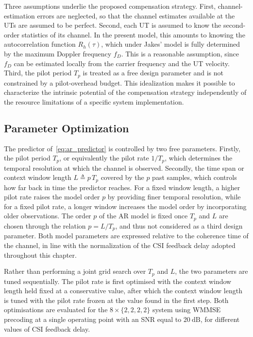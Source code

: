 Three assumptions underlie the proposed compensation strategy.
First, channel-estimation errors are neglected, so that the channel estimates available at the \acp{UT} are assumed to be perfect.
Second, each \ac{UT} is assumed to know the second-order statistics of its channel. In the present model, this amounts to knowing the autocorrelation function $R_h(\tau)$, which under Jakes' model is fully determined by the maximum Doppler frequency $f_D$. This is a reasonable assumption, since $f_D$ can be estimated locally from the carrier frequency and the \ac{UT} velocity.
Third, the pilot period $T_p$ is treated as a free design parameter and is not constrained by a pilot-overhead budget. This idealization makes it possible to characterize the intrinsic potential of the compensation strategy independently of the resource limitations of a specific system implementation.

\subsection{Parameter Optimization}
\label{subsection:compensation_parameter_optimization}

The predictor of~\eqref{eq:ar_predictor} is controlled by two free parameters. 
Firstly, the pilot period $T_p$, or equivalently the pilot rate $1/T_p$, which determines the temporal resolution at which the channel is observed.
Secondly, the time span or context window length $L \triangleq p\, T_p$ covered by the $p$ past samples, which controls how far back in time the predictor reaches.
For a fixed window length, a higher pilot rate raises the model order $p$ by providing finer temporal resolution, while for a fixed pilot rate, a longer window increases the model
order by incorporating older observations.
The order $p$ of the \ac{AR} model is fixed once $T_p$ and $L$ are chosen through the relation $p = L/T_p$, and thus not considered as a third design parameter.
Both model parameters are expressed relative to the coherence time of the channel, in line with the normalization of the \ac{CSI} feedback delay adopted throughout this chapter.

Rather than performing a joint grid search over $T_p$ and $L$, the two parameters are tuned sequentially. 
The pilot rate is first optimised with the context window length held fixed at a conservative value, after which the context window length is tuned with the pilot rate frozen at the value found in the first step.
Both optimisations are evaluated for the $8 \times \{2, 2, 2, 2\}$ system using \ac{WMMSE} precoding at a single operating point with an \ac{SNR} equal to $20~\mathrm{dB}$, for different values of \ac{CSI} feedback delay.

